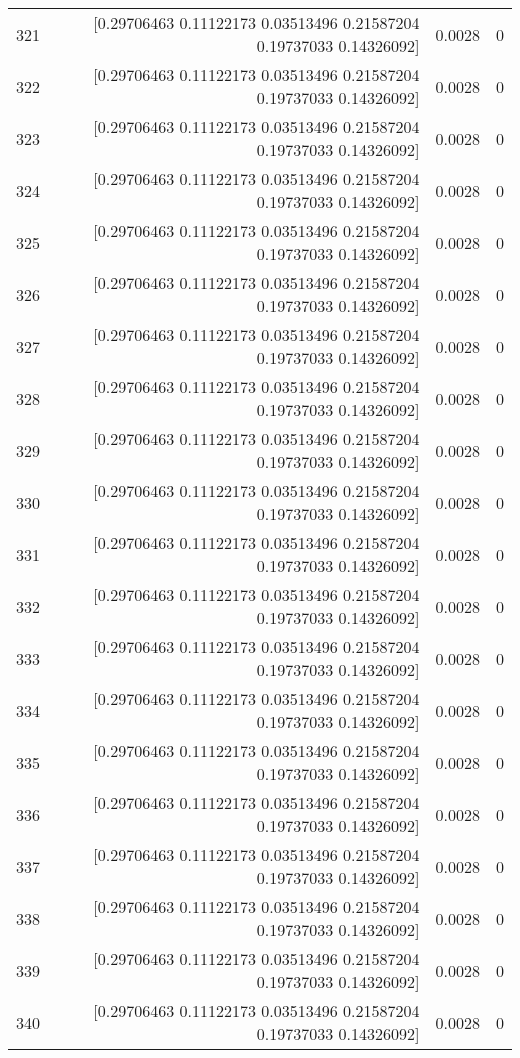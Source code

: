 \begin{longtable}{lrrr}
321 & [0.29706463 0.11122173 0.03513496 0.21587204 0.19737033 0.14326092] & 0.0028 & 0 \\
322 & [0.29706463 0.11122173 0.03513496 0.21587204 0.19737033 0.14326092] & 0.0028 & 0 \\
323 & [0.29706463 0.11122173 0.03513496 0.21587204 0.19737033 0.14326092] & 0.0028 & 0 \\
324 & [0.29706463 0.11122173 0.03513496 0.21587204 0.19737033 0.14326092] & 0.0028 & 0 \\
325 & [0.29706463 0.11122173 0.03513496 0.21587204 0.19737033 0.14326092] & 0.0028 & 0 \\
326 & [0.29706463 0.11122173 0.03513496 0.21587204 0.19737033 0.14326092] & 0.0028 & 0 \\
327 & [0.29706463 0.11122173 0.03513496 0.21587204 0.19737033 0.14326092] & 0.0028 & 0 \\
328 & [0.29706463 0.11122173 0.03513496 0.21587204 0.19737033 0.14326092] & 0.0028 & 0 \\
329 & [0.29706463 0.11122173 0.03513496 0.21587204 0.19737033 0.14326092] & 0.0028 & 0 \\
330 & [0.29706463 0.11122173 0.03513496 0.21587204 0.19737033 0.14326092] & 0.0028 & 0 \\
331 & [0.29706463 0.11122173 0.03513496 0.21587204 0.19737033 0.14326092] & 0.0028 & 0 \\
332 & [0.29706463 0.11122173 0.03513496 0.21587204 0.19737033 0.14326092] & 0.0028 & 0 \\
333 & [0.29706463 0.11122173 0.03513496 0.21587204 0.19737033 0.14326092] & 0.0028 & 0 \\
334 & [0.29706463 0.11122173 0.03513496 0.21587204 0.19737033 0.14326092] & 0.0028 & 0 \\
335 & [0.29706463 0.11122173 0.03513496 0.21587204 0.19737033 0.14326092] & 0.0028 & 0 \\
336 & [0.29706463 0.11122173 0.03513496 0.21587204 0.19737033 0.14326092] & 0.0028 & 0 \\
337 & [0.29706463 0.11122173 0.03513496 0.21587204 0.19737033 0.14326092] & 0.0028 & 0 \\
338 & [0.29706463 0.11122173 0.03513496 0.21587204 0.19737033 0.14326092] & 0.0028 & 0 \\
339 & [0.29706463 0.11122173 0.03513496 0.21587204 0.19737033 0.14326092] & 0.0028 & 0 \\
340 & [0.29706463 0.11122173 0.03513496 0.21587204 0.19737033 0.14326092] & 0.0028 & 0 \\

\end{longtable}
